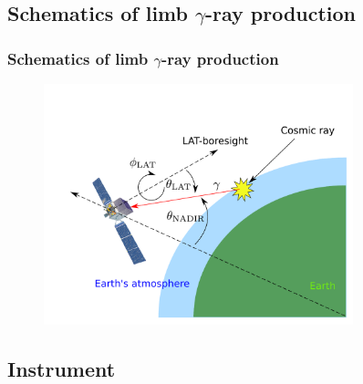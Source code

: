 \documentclass{beamer}
\begin{document}
\subsection{Schematics of limb $\gamma$-ray production}
\begin{frame}
\frametitle{Schematics of limb $\gamma$-ray production}
\centering
\begin{figure}[h!]
\includegraphics[width = 0.8\textwidth]{lat_production_schematic}
\end{figure}
\end{frame}


\subsection{Instrument}
\end{document}
